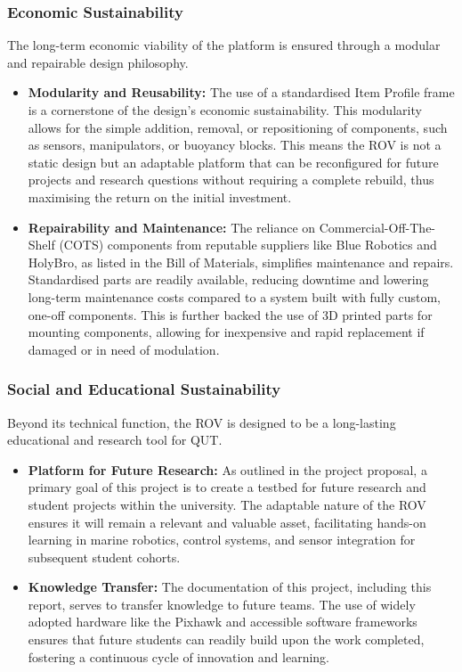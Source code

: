\documentclass[11pt, a4paper]{article}
\begin{document}
\subsubsection{Economic Sustainability}
The long-term economic viability of the platform is ensured through a modular and repairable design philosophy.
\begin{itemize}
    \item \textbf{Modularity and Reusability:} The use of a standardised Item Profile frame is a cornerstone of the design's economic sustainability. This modularity allows for the simple addition, removal, or repositioning of components, such as sensors, manipulators, or buoyancy blocks. This means the ROV is not a static design but an adaptable platform that can be reconfigured for future projects and research questions without requiring a complete rebuild, thus maximising the return on the initial investment.
    
    \item \textbf{Repairability and Maintenance:} The reliance on Commercial-Off-The-Shelf (COTS) components from reputable suppliers like Blue Robotics and HolyBro, as listed in the Bill of Materials, simplifies maintenance and repairs. Standardised parts are readily available, reducing downtime and lowering long-term maintenance costs compared to a system built with fully custom, one-off components. This is further backed the use of 3D printed parts for mounting components, allowing for inexpensive and rapid replacement if damaged or in need of modulation.
\end{itemize}

\subsubsection{Social and Educational Sustainability}
Beyond its technical function, the ROV is designed to be a long-lasting educational and research tool for QUT.
\begin{itemize}
    \item \textbf{Platform for Future Research:} As outlined in the project proposal, a primary goal of this project is to create a testbed for future research and student projects within the university. The adaptable nature of the ROV ensures it will remain a relevant and valuable asset, facilitating hands-on learning in marine robotics, control systems, and sensor integration for subsequent student cohorts.
    
    \item \textbf{Knowledge Transfer:} The documentation of this project, including this report, serves to transfer knowledge to future teams. The use of widely adopted hardware like the Pixhawk and accessible software frameworks ensures that future students can readily build upon the work completed, fostering a continuous cycle of innovation and learning.
\end{itemize}
\end{document}
